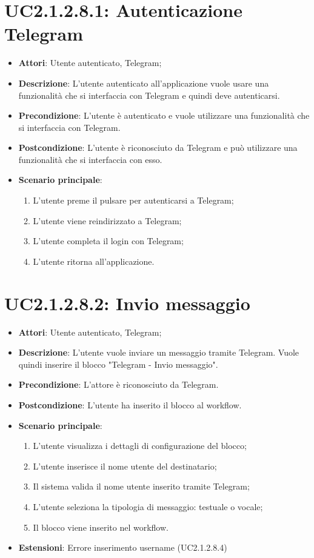 \section{UC2.1.2.8.1: Autenticazione Telegram}
\label{UC2.1.2.8.1}
\begin{itemize}
	\item \textbf{Attori}: Utente autenticato, Telegram;
	\item \textbf{Descrizione}: L'utente autenticato all'applicazione vuole usare una funzionalità che si interfaccia con Telegram e quindi deve autenticarsi. 
	\item \textbf{Precondizione}: L'utente è autenticato e vuole utilizzare una funzionalità che si interfaccia con Telegram. 
	\item \textbf{Postcondizione}: L'utente è riconosciuto da Telegram e può utilizzare una funzionalità che si interfaccia con esso. 
	\item \textbf{Scenario principale}:
	\begin{enumerate} \item L'utente preme il pulsare per autenticarsi a Telegram;  \item  L'utente viene reindirizzato a Telegram;  \item  L'utente completa il login con Telegram;  \item  L'utente ritorna all'applicazione.\end{enumerate}
\end{itemize}

\section{UC2.1.2.8.2: Invio messaggio}
\label{UC2.1.2.8.2}
\begin{itemize}
	\item \textbf{Attori}: Utente autenticato, Telegram;
	\item \textbf{Descrizione}: L'utente vuole inviare un messaggio tramite Telegram. Vuole quindi inserire il blocco "Telegram - Invio messaggio".
	\item \textbf{Precondizione}: L'attore è riconosciuto da Telegram.
	\item \textbf{Postcondizione}: L'utente ha inserito il blocco al workflow.
	\item \textbf{Scenario principale}:
	\begin{enumerate} \item L'utente visualizza i dettagli di configurazione del blocco;   \item  L'utente inserisce il nome utente del destinatario;  \item  Il sistema valida il nome utente inserito tramite Telegram;  \item  L'utente seleziona la tipologia di messaggio: testuale o vocale;  \item  Il blocco viene inserito nel workflow.\end{enumerate}
	\item \textbf{Estensioni}:
	Errore inserimento username (UC2.1.2.8.4)
\end{itemize}

